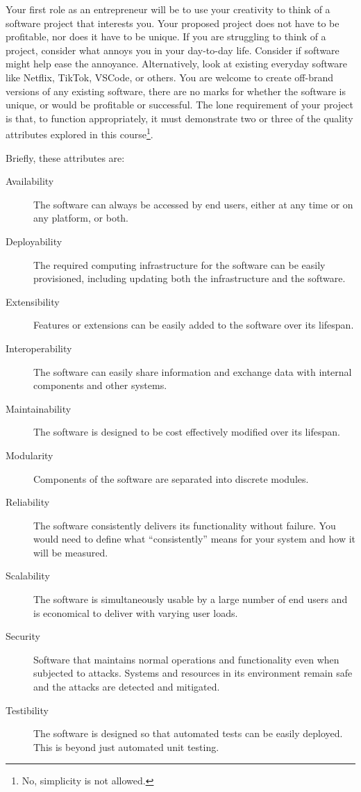 \documentclass{csse4400}
\begin{document}
Your first role as an entrepreneur will be to use your creativity to think of a software project that interests you.
Your proposed project does not have to be profitable, nor does it have to be unique.
If you are struggling to think of a project, consider what annoys you in your day-to-day life.
Consider if software might help ease the annoyance.
Alternatively, look at existing everyday software like Netflix, TikTok, VSCode, or others.
You are welcome to create off-brand versions of any existing software,
there are no marks for whether the software is unique, or would be profitable or successful.
The lone requirement of your project is that, to function appropriately, it must demonstrate two or three of the quality attributes 
explored in this course\footnote{No, simplicity is not allowed.}.

\newpage\noindent
Briefly, these attributes are:
\begin{description}
    \item[Availability] The software can always be accessed by end users, either at any time or on any platform, or both.
    \item[Deployability] The required computing infrastructure for the software can be easily provisioned, including updating both the infrastructure and the software.
    \item[Extensibility] Features or extensions can be easily added to the software over its lifespan.
    \item[Interoperability] The software can easily share information and exchange data with internal components and other systems.
    \item[Maintainability] The software is designed to be cost effectively modified over its lifespan.
    \item[Modularity] Components of the software are separated into discrete modules.
    \item[Reliability] The software consistently delivers its functionality without failure. You would need to define what ``consistently'' means for your system and how it will be measured.
    \item[Scalability] The software is simultaneously usable by a large number of end users and is economical to deliver with varying user loads.
    \item[Security] Software that maintains normal operations and functionality even when subjected to attacks.
                             Systems and resources in its environment remain safe and the attacks are detected and mitigated.
    \item[Testibility] The software is designed so that automated tests can be easily deployed. This is beyond just automated unit testing.
\end{description}
\end{document}
